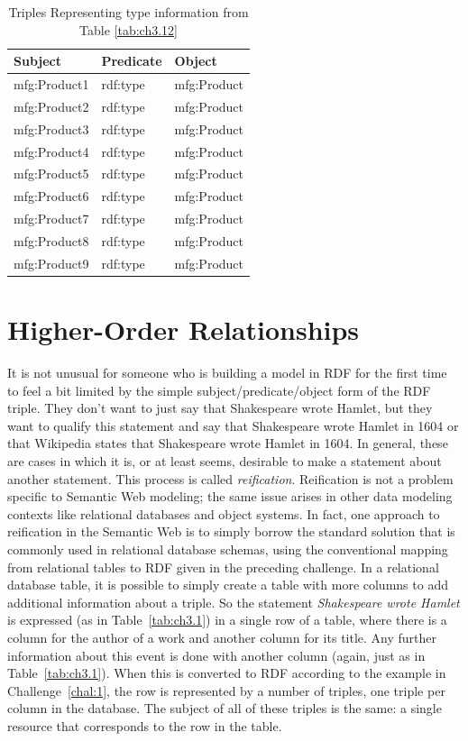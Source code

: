 \begin{challenge}
\begin{table}[h]
\centering
\begin{tabular}{||l l l ||} 
 \hline
 Subject&Predicate&Object \\ [0.5ex] 
 \hline\hline
mfg:Product1&rdf:type&mfg:Product\\
mfg:Product2&rdf:type&mfg:Product\\
mfg:Product3&rdf:type&mfg:Product\\
mfg:Product4&rdf:type&mfg:Product\\
mfg:Product5&rdf:type&mfg:Product\\
mfg:Product6&rdf:type&mfg:Product\\
mfg:Product7&rdf:type&mfg:Product\\
mfg:Product8&rdf:type&mfg:Product\\
mfg:Product9&rdf:type&mfg:Product\\
\hline
\end{tabular}
\caption{Triples Representing type information from Table \ref{tab:ch3.12}}
\label{tab:ch3.14}
\end{table}

\end{challenge}

\section{Higher-Order Relationships}

It is not unusual for someone who is building a model in RDF for the
first time to feel a bit limited by the simple subject/predicate/object
form of the RDF triple. They don't want to just say that Shakespeare
wrote Hamlet, but they want to qualify this statement and say that
Shakespeare wrote Hamlet in 1604 or that Wikipedia states that
Shakespeare wrote Hamlet in 1604. In general, these are cases in which
it is, or at least seems, desirable to make a statement about another
statement. This process is called \emph{reification}. Reification is not a
problem specific to Semantic Web modeling; the same issue arises in
other data modeling contexts like relational databases and object
systems. In fact, one approach to reification in the Semantic Web is to
simply borrow the standard solution that is commonly used in relational
database schemas, using the conventional mapping from relational tables
to RDF given in the preceding challenge. In a relational database table,
it is possible to simply create a table with more columns to add
additional information about a triple. So the statement
\emph{Shakespeare wrote Hamlet} is expressed (as in Table~\ref{tab:ch3.1}) in a
single row of a table, where there is a column for the author of a work
and another column for its title. Any further information about this
event is done with another column (again, just as in Table~\ref{tab:ch3.1}). When
this is converted to RDF according to the example in Challenge~\ref{chal:1}, the
row is represented by a number of triples, one triple per column in the
database. The subject of all of these triples is the same: a single
resource that corresponds to the row in the table.

